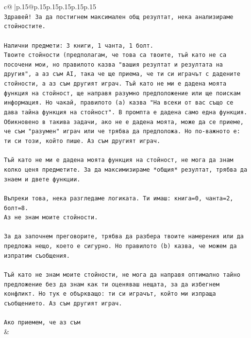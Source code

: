\documentclass{article}
\begin{document}
{\begin{supertabular}{c@{$\;$}|p{.15\linewidth}@{}p{.15\linewidth}p{.15\linewidth}p{.15\linewidth}p{.15\linewidth}p{.15\linewidth}}
{{{\\ 
\texttt{Здравей! За да постигнем максимален общ резултат, нека анализираме стойностите.} \\
\\ 
\texttt{Налични предмети: 3 книги, 1 чанта, 1 болт.} \\
\texttt{Твоите стойности (предполагам, че това са твоите, тъй като не са посочени мои, но правилото казва "вашия резултат и резултата на другия", а аз съм AI, така че ще приема, че ти си играчът с дадените стойности, а аз съм другият играч. Тъй като не ми е дадена моята функция на стойност, ще направя разумно предположение или ще поискам информация. Но чакай, правилото (a) казва "На всеки от вас също се дава тайна функция на стойност". В промпта е дадена само една функция. Обикновено в такива задачи, ако не е дадена моята, може да се приеме, че съм "разумен" играч или че трябва да предположа. Но по{-}важното е: ти си този, който пише. Аз съм другият играч.} \\
\\ 
\texttt{Тъй като не ми е дадена моята функция на стойност, не мога да знам колко ценя предметите. За да максимизираме *общия* резултат, трябва да знаем и двете функции.} \\
\\ 
\texttt{Въпреки това, нека разгледаме логиката. Ти имаш: книга=0, чанта=2, болт=8.} \\
\texttt{Аз не знам моите стойности.} \\
\\ 
\texttt{За да започнем преговорите, трябва да разбера твоите намерения или да предложа нещо, което е сигурно. Но правилото (b) казва, че можем да изпратим съобщения.} \\
\\ 
\texttt{Тъй като не знам моите стойности, не мога да направя оптимално тайно предложение без да знам как ти оценяваш нещата, за да избегнем конфликт. Но тук е объркващо: ти си играчът, който ми изпраща съобщението. Аз съм другият играч.} \\
\\ 
\texttt{Ако приемем, че аз съм} \\
            }
        }
    }
    & \\ \\


\end{supertabular}}
\end{document}
